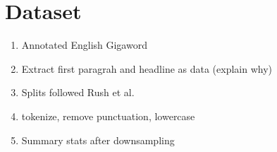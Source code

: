 \section{Dataset}
\label{sec: dataset}

\begin{enumerate}
\item Annotated English Gigaword
\item Extract first paragrah and headline as data (explain why)
\item Splits followed Rush et al.
\item tokenize, remove punctuation, lowercase
\item Summary stats after downsampling
\end{enumerate}



